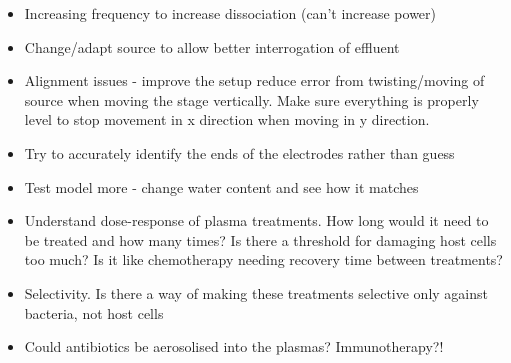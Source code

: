 \documentclass[11pt, oneside]{article}   	%
\begin{document}
\begin{itemize}
\item Increasing frequency to increase dissociation (can't increase power)
\item Change/adapt source to allow better interrogation of effluent
\item Alignment issues - improve the setup reduce error from twisting/moving of source when moving the stage vertically. Make sure everything is properly level to stop movement in x direction when moving in y direction.
\item Try to accurately identify the ends of the electrodes rather than guess
\item Test model more - change water content and see how it matches

\item Understand dose-response of plasma treatments. How long would it need to be treated and how many times? Is there a threshold for damaging host cells too much? Is it like chemotherapy needing recovery time between treatments? 
\item Selectivity. Is there a way of making these treatments selective only against bacteria, not host cells
\item Could antibiotics be aerosolised into the plasmas? Immunotherapy?!

\end{itemize}



\end{document}
